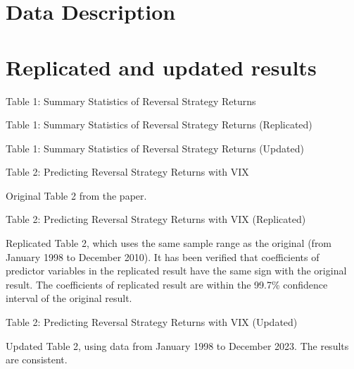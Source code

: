 \documentclass{article}
\newcommand*{\PathToOutput}{../output/}
\begin{document}
\section{Data Description}


\section{Replicated and updated results}


\begin{table}
    \centering
    \caption*{Table 1:  Summary Statistics of Reversal Strategy Returns}
\end{table}


\begin{table}
    \centering
    \caption*{Table 1:  Summary Statistics of Reversal Strategy Returns (Replicated)}
\end{table}


\begin{table}
    \centering
    \caption*{Table 1:  Summary Statistics of Reversal Strategy Returns (Updated)}
\end{table}


\begin{landscape}
\begin{table}
    \centering
    \caption*{Table 2: Predicting Reversal Strategy Returns with VIX}
    
    \small Original Table 2 from the paper.
    \medskip

    
\end{table}


\begin{table}
    \centering
    \caption*{Table 2: Predicting Reversal Strategy Returns with VIX (Replicated)}

    \raggedright
    \small Replicated Table 2, which uses the same sample range as the original (from 
    January 1998 to December 2010). 
    It has been verified that coefficients of predictor variables in the replicated result
    have the same sign with the original result. The coefficients of replicated result are
    within the 99.7\% confidence interval of the original result.
    \medskip

    \centering
    
\end{table}

\begin{table}
    \centering
    \caption*{Table 2: Predicting Reversal Strategy Returns with VIX (Updated)}

    \small Updated Table 2, using data from January 1998 to December 2023.
    The results are consistent.
    \medskip

    
\end{table}

\end{landscape}

\newpage


\end{document}
